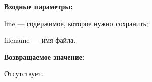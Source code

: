 \textbf{Входные параметры:}

line --- содержимое, которое нужно сохранить;
 
filename --- имя файла.

\textbf{Возвращаемое значение:}

Отсутствует.